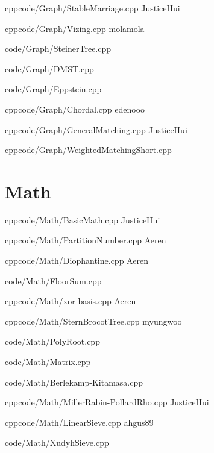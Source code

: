 \documentclass[landscape, 8pt, a4paper, oneside]{extarticle}
\begin{document}
\begin{multicols*}{3}
{}{}
{cpp}{code/Graph/StableMarriage.cpp}
{JusticeHui}

{}{}
{cpp}{code/Graph/Vizing.cpp}
{molamola}

{code/Graph/SteinerTree.cpp}

{code/Graph/DMST.cpp}

{code/Graph/Eppstein.cpp}

{}{}
{cpp}{code/Graph/Chordal.cpp}
{edenooo}

{}{}
{cpp}{code/Graph/GeneralMatching.cpp}
{JusticeHui}

{}{}
{cpp}{code/Graph/WeightedMatchingShort.cpp}
{}

\section{Math}

{}{}
{cpp}{code/Math/BasicMath.cpp}
{JusticeHui}

{}{}
{cpp}{code/Math/PartitionNumber.cpp}
{Aeren}

{}{}
{cpp}{code/Math/Diophantine.cpp}
{Aeren}

{code/Math/FloorSum.cpp}

{}{}
{cpp}{code/Math/xor-basis.cpp}
{Aeren}

{}{}
{cpp}{code/Math/SternBrocotTree.cpp}
{myungwoo}

{code/Math/PolyRoot.cpp}

{code/Math/Matrix.cpp}

{code/Math/Berlekamp-Kitamasa.cpp}

{}{}
{cpp}{code/Math/MillerRabin-PollardRho.cpp}
{JusticeHui}

{}{}
{cpp}{code/Math/LinearSieve.cpp}
{ahgus89}

{code/Math/XudyhSieve.cpp}


\end{multicols*}
\end{document}
